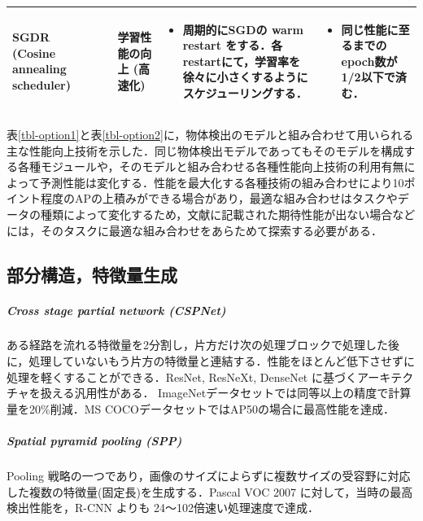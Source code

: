 \documentclass[twocolumn]{jsarticle} %
\begin{document}
\begin{table}
\begin{center}
\begin{tabularx}{\linewidth}{XcXp{7cm}X}
            SGDR (Cosine annealing scheduler) & \cite{LoshHut17} & 学習性能の向上 (高速化) & 
            \begin{itemize}
                \vspace{-0.7\baselineskip}
                \setlength{\leftskip}{-3mm}
                \item 周期的にSGDの warm restart をする．各restartにて，学習率を徐々に小さくするようにスケジューリングする．
            \end{itemize}
            &
            \begin{itemize}
                \vspace{-0.7\baselineskip}
                \setlength{\leftskip}{-3mm}
                \item 同じ性能に至るまでのepoch数が1/2以下で済む．
            \end{itemize}
            \\
            \bottomrule
        \end{tabularx}
    \end{center}
\end{table}%

表\ref{tbl-option1}と表\ref{tbl-option2}に，物体検出のモデルと組み合わせて用いられる主な性能向上技術を示した．同じ物体検出モデルであってもそのモデルを構成する各種モジュールや，そのモデルと組み合わせる各種性能向上技術の利用有無によって予測性能は変化する．性能を最大化する各種技術の組み合わせにより10ポイント程度のAPの上積みができる場合があり，最適な組み合わせはタスクやデータの種類によって変化するため，文献に記載された期待性能が出ない場合などには，そのタスクに最適な組み合わせをあらためて探索する必要がある．

\subsection{部分構造，特徴量生成}
\subparagraph{Cross stage partial network (CSPNet) \cite{WLWCHY20}}ある経路を流れる特徴量を2分割し，片方だけ次の処理ブロックで処理した後に，処理していないもう片方の特徴量と連結する．性能をほとんど低下させずに処理を軽くすることができる．ResNet, ResNeXt, DenseNet に基づくアーキテクチャを扱える汎用性がある．
ImageNetデータセットでは同等以上の精度で計算量を20\%削減．MS COCOデータセットではAP50の場合に最高性能を達成．

\subparagraph{Spatial pyramid pooling (SPP) \cite{HZRS15,HZRS14}} Pooling 戦略の一つであり，画像のサイズによらずに複数サイズの受容野に対応した複数の特徴量(固定長)を生成する．Pascal VOC 2007 に対して，当時の最高検出性能を，R-CNN よりも 24〜102倍速い処理速度で達成．
\end{document}

